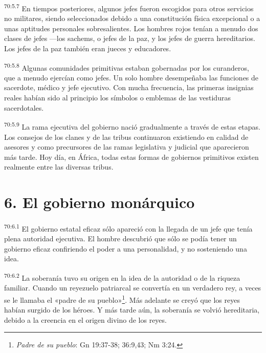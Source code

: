 \par
\textsuperscript{70:5.7} En tiempos posteriores, algunos jefes fueron escogidos para otros servicios no militares, siendo seleccionados debido a una constitución física excepcional o a unas aptitudes personales sobresalientes. Los hombres rojos tenían a menudo dos clases de jefes ---los sachems, o jefes de la paz, y los jefes de guerra hereditarios. Los jefes de la paz también eran jueces y educadores.

\par
\textsuperscript{70:5.8} Algunas comunidades primitivas estaban gobernadas por los curanderos, que a menudo ejercían como jefes. Un solo hombre desempeñaba las funciones de sacerdote, médico y jefe ejecutivo. Con mucha frecuencia, las primeras insignias reales habían sido al principio los símbolos o emblemas de las vestiduras sacerdotales.

\par
\textsuperscript{70:5.9} La rama ejecutiva del gobierno nació gradualmente a través de estas etapas. Los consejos de los clanes y de las tribus continuaron existiendo en calidad de asesores y como precursores de las ramas legislativa y judicial que aparecieron más tarde. Hoy día, en África, todas estas formas de gobiernos primitivos existen realmente entre las diversas tribus.

\section*{6. El gobierno monárquico}
\par
\textsuperscript{70:6.1} El gobierno estatal eficaz sólo apareció con la llegada de un jefe que tenía plena autoridad ejecutiva. El hombre descubrió que sólo se podía tener un gobierno eficaz confiriendo el poder a una personalidad, y no sosteniendo una idea.

\par
\textsuperscript{70:6.2} La soberanía tuvo su origen en la idea de la autoridad o de la riqueza familiar. Cuando un reyezuelo patriarcal se convertía en un verdadero rey, a veces se le llamaba el «padre de su pueblo»\footnote{\textit{Padre de su pueblo}: Gn 19:37-38; 36:9,43; Nm 3:24.}. Más adelante se creyó que los reyes habían surgido de los héroes. Y más tarde aún, la soberanía se volvió hereditaria, debido a la creencia en el origen divino de los reyes.

